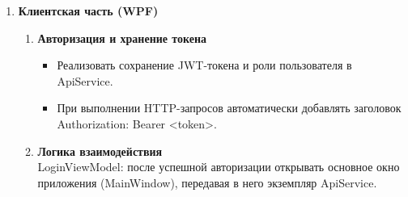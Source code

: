 \documentclass[12pt]{article}
\renewcommand{\texttt}[1]{{\small\ttfamily #1}}
\numberwithin{figure}{section}
\begin{document}
\begin{enumerate}
\begin{enumerate}
		            \begin{itemize}
			            \item Обновить классы сущностей \texttt{User}, \texttt{Order}, \texttt{OrderItem}:
			                  \begin{itemize}
				                  \item Добавить навигационные свойства;
				                  \item Установить аннотации сериализации при необходимости (\texttt{[JsonIgnore]}).
			                  \end{itemize}
			            \item В контексте данных (\texttt{StoreDbContext}) настроить связи между сущностями.
			            \item Обеспечить каскадное удаление:
			                  \begin{itemize}
				                  \item При удалении пользователя должны автоматически удаляться связанные с ним заказы;
				                  \item При удалении заказа — связанные с ним позиции заказа (\texttt{OrderItem}).
			                  \end{itemize}
			            \item Применить изменения к базе данных с использованием миграций Entity Framework Core (\texttt{Add-Migration}, \texttt{Update-Database}).
		            \end{itemize}
	      \end{enumerate}
	\item \textbf{Клиентская часть (WPF)}
	      \begin{enumerate}
		      \item \textbf{Авторизация и хранение токена}
		            \begin{itemize}
			            \item Реализовать сохранение JWT-токена и роли пользователя в \texttt{ApiService}.
			            \item При выполнении HTTP-запросов автоматически добавлять заголовок \texttt{Authorization: Bearer <token>}.
		            \end{itemize}
		      \item \textbf{Логика взаимодействия} \\
		            \texttt{LoginViewModel}: после успешной авторизации открывать основное окно приложения (\texttt{MainWindow}), передавая в него экземпляр \texttt{ApiService}. \\

\end{enumerate}
\end{enumerate}
\end{document}
